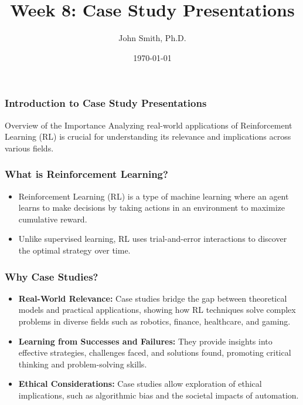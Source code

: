 \documentclass[aspectratio=169]{beamer}
\title[Week 8: Case Study Presentations]{Week 8: Case Study Presentations}
\author[J. Smith]{John Smith, Ph.D.}
\institute[University Name]{
  Department of Computer Science\\
  University Name\\
  \vspace{0.3cm}
  Email: email@university.edu\\
  Website: www.university.edu
}
\date{\today}
\begin{document}
\frame{\titlepage}

\begin{frame}[fragile]
    \frametitle{Introduction to Case Study Presentations}
    \begin{block}{Overview of the Importance}
        Analyzing real-world applications of Reinforcement Learning (RL) is crucial for understanding its relevance and implications across various fields.
    \end{block}
\end{frame}

\begin{frame}[fragile]
    \frametitle{What is Reinforcement Learning?}
    \begin{itemize}
        \item Reinforcement Learning (RL) is a type of machine learning where an agent learns to make decisions by taking actions in an environment to maximize cumulative reward.
        \item Unlike supervised learning, RL uses trial-and-error interactions to discover the optimal strategy over time.
    \end{itemize}
\end{frame}

\begin{frame}[fragile]
    \frametitle{Why Case Studies?}
    \begin{itemize}
        \item \textbf{Real-World Relevance:} Case studies bridge the gap between theoretical models and practical applications, showing how RL techniques solve complex problems in diverse fields such as robotics, finance, healthcare, and gaming.
        \item \textbf{Learning from Successes and Failures:} They provide insights into effective strategies, challenges faced, and solutions found, promoting critical thinking and problem-solving skills.
        \item \textbf{Ethical Considerations:} Case studies allow exploration of ethical implications, such as algorithmic bias and the societal impacts of automation.
    \end{itemize}
\end{frame}
\end{document}
